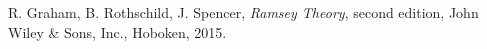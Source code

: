 \documentclass[a4paper]{amsproc}
\theoremstyle{plain}
\theoremstyle{named}
\begin{document}
\begin{longtable}{ | l | r | r | r | }
\end{longtable}

\begin{thebibliography}{9}

  R. Graham, B. Rothschild, J. Spencer,
  \emph{Ramsey Theory}, second edition,
  John Wiley \& Sons, Inc., Hoboken,
  2015.

\end{thebibliography}
\end{document}

